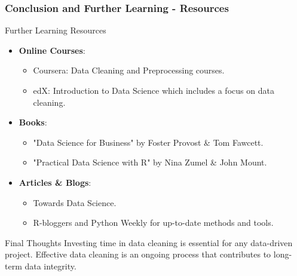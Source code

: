 \documentclass[aspectratio=169]{beamer}
\begin{document}
\begin{frame}[fragile]
    \frametitle{Conclusion and Further Learning - Resources}
    \begin{block}{Further Learning Resources}
        \begin{itemize}
            \item \textbf{Online Courses}:
            \begin{itemize}
                \item Coursera: Data Cleaning and Preprocessing courses.
                \item edX: Introduction to Data Science which includes a focus on data cleaning.
            \end{itemize}
    
            \item \textbf{Books}:
            \begin{itemize}
                \item "Data Science for Business" by Foster Provost \& Tom Fawcett.
                \item "Practical Data Science with R" by Nina Zumel \& John Mount.
            \end{itemize}
    
            \item \textbf{Articles \& Blogs}:
            \begin{itemize}
                \item Towards Data Science.
                \item R-bloggers and Python Weekly for up-to-date methods and tools.
            \end{itemize}
        \end{itemize}
    \end{block}

    \begin{block}{Final Thoughts}
        Investing time in data cleaning is essential for any data-driven project. Effective data cleaning is an ongoing process that contributes to long-term data integrity.
    \end{block}
\end{frame}
\end{document}
